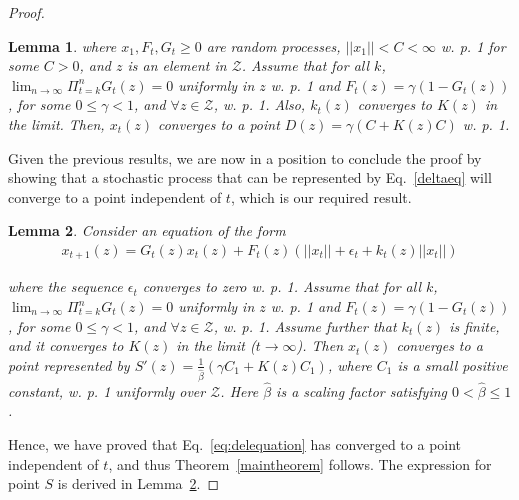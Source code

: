 \documentclass[jair, twoside,11pt,theapa]{article}
\newtheorem{lemm}{Lemma}
\begin{document}
\begin{proof}
\begin{lemm}
\noindent where $x_1, F_t, G_t \geq 0 $ are random processes,  $||x_1|| < C < \infty$ w. p. 1 for some $C>0$, and $z$ is an element in $\mathcal{Z}$. Assume that for all $k$, $\lim_{n \xrightarrow{} \infty} \Pi_{t=k}^n G_t(z) = 0$ uniformly in $z$ w. p. 1 and $F_t(z) = \gamma(1 - G_t(z))$, for some $0 \leq \gamma < 1$, and $\forall z \in \mathcal{Z}$,  w. p. 1. Also, $k_t(z)$ converges to $K(z)$ in the limit. Then, $x_t(z)$ converges to a point $D(z) = \gamma(C + K(z)C)$ w. p. 1. 



\end{lemm}


Given the previous results, we are now in a position to conclude the proof by showing that a stochastic process that can be represented by Eq.~\ref{deltaeq} will converge to a point independent of $t$, which is our required result. 



\begin{lemm}\label{lemma:finallemma}
Consider an equation of the form
\begin{equation}\label{eq:perterbationterm}
    \begin{array}{l}
         x_{t+1}(z) = G_t(z) x_t(z) + F_t(z) (||x_t|| + \epsilon_t + k_t(z) ||x_t||)
    \end{array}
\end{equation}

\noindent where the sequence $\epsilon_t $ converges to zero w. p. 1. Assume that for all $k$, $\lim_{n \xrightarrow{} \infty} \Pi_{t=k}^n G_t(z) = 0$ uniformly in $z$ w. p. 1 and $F_t(z) = \gamma(1 - G_t(z))$, for some $0 \leq \gamma < 1$, and $\forall z \in \mathcal{Z}$,  w. p. 1. Assume further that $k_t(z)$ is finite, and it converges to $K(z)$ in the limit ($t \xrightarrow{} \infty$). Then $x_t(z)$ converges to a point represented by $S'(z) = \frac{1}{\hat{\beta}} (\gamma C_1 + K(z) C_1) $, where $C_1$ is a small positive constant, w. p. 1 uniformly over $\mathcal{Z}$. Here $\hat{\beta}$ is a scaling factor satisfying $0 < \hat{\beta} \leq 1$. 






\end{lemm}

Hence, we have proved that Eq.~\ref{eq:delequation} has converged to a point independent of $t$, and thus Theorem~\ref{maintheorem} follows. The expression for point $S$ is derived in Lemma~\ref{lemma:finallemma}.

\end{proof}
\end{document}
